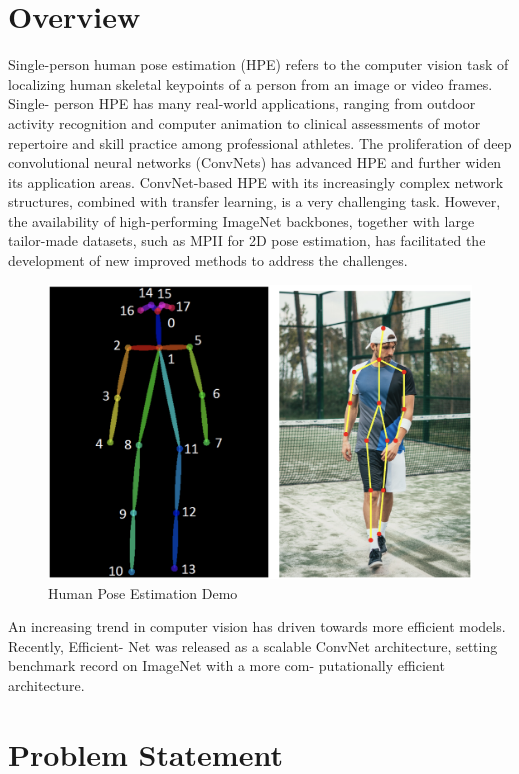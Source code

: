 \documentclass{fisatprojectfinal}
\begin{document}
\section{Overview}
Single-person human pose estimation (HPE) refers to the
computer vision task of localizing human skeletal keypoints
of a person from an image or video frames. Single-
person HPE has many real-world applications, ranging from
outdoor activity recognition and computer animation to clinical assessments of motor repertoire and skill practice
among professional athletes. The proliferation of deep
convolutional neural networks (ConvNets) has advanced
HPE and further widen its application areas. ConvNet-based
HPE with its increasingly complex network structures,
combined with transfer learning, is a very challenging task.
However, the availability of high-performing ImageNet
backbones, together with large tailor-made datasets, such
as MPII for 2D pose estimation, has facilitated the
development of new improved methods to address the
challenges.
\begin{figure}[h!]
\begin{center}
\includegraphics[scale=.3]{pose-estimation}
\caption{Human Pose Estimation Demo}
\end{center}
\end{figure}
An increasing trend in computer vision has driven towards
more efficient models. Recently, Efficient-
Net was released as a scalable ConvNet architecture,
setting benchmark record on ImageNet with a more com-
putationally efficient architecture. 
\section{Problem Statement}
\end{document}
